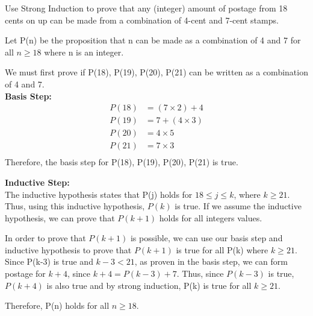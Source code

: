 \documentclass[12pt]{article}
\newenvironment{exercise}[2][Exercise]{\begin{trivlist}
\item[\hskip \labelsep {\bfseries #1}\hskip \labelsep {\bfseries #2.}]}{\end{trivlist}}
\begin{document}
\begin{exercise}{5}
Use Strong Induction to prove that any (integer) amount of postage from 18 cents on up can be made from a combination of 4-cent and 7-cent stamps.
\end{exercise}

Let P(n) be the proposition that n can be made as a combination of 4 and 7 for all $n \geq 18$ where n is an integer.

We must first prove if P(18), P(19), P(20), P(21) can be written as a combination of 4 and 7. \\
\textbf{Basis Step:}
\begin{align*}
P(18) &= (7 \times 2) + 4\\
P(19) &= 7 + (4 \times 3) \\
P(20) &= 4 \times 5 \\
P(21) &= 7 \times 3 \\
\end{align*}
Therefore, the basis step for P(18), P(19), P(20), P(21) is true.

\textbf{Inductive Step:\\}
The inductive hypothesis states that P(j) holds for $18 \leq j \leq k$, where $k \geq 21$. Thus, using this inductive hypothesis, $P(k)$ is true. If we assume the inductive hypothesis, we can prove that $P(k+1)$ holds for all integers values.

In order to prove that $P(k+1)$ is possible, we can use our basis step and inductive hypothesis to prove that $P(k+1)$ is true for all P(k) where $k \geq 21$. Since P(k-3) is true and $k-3 < 21$, as proven in the basis step, we can form postage for $k+4$, since $k+4 = P(k-3) + 7$. Thus, since $P(k-3)$ is true, $P(k+4)$ is also true and by strong induction, P(k) is true for all $k \geq 21$.

Therefore, P(n) holds for all $n \geq 18$.


 
\end{document}

